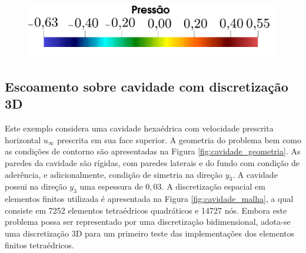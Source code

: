 \begin{figure}[!htbp]
	{\includegraphics[trim=0cm 0.2cm 0cm 0cm,clip=true,scale=0.3]{Imagens/Cap2/cilindro_legendaPress.pdf}}
	\label{fig:cilindro_camposPressao}
\end{figure}

\subsection{Escoamento sobre cavidade com discretização 3D} \label{capitulo:Cap2:VerApl:CavQuad}

Este exemplo considera uma cavidade hexaédrica com velocidade prescrita horizontal $u_{\infty}$ prescrita em sua face superior. A geometria do problema bem como as condições de contorno são apresentadas na Figura \ref{fig:cavidade_geometria}. As paredes da cavidade são rígidas, com paredes laterais e do fundo com condição de aderência, e adicionalmente, condição de simetria na direção $y_3$. A cavidade possui na direção $y_3$ uma espessura de $0,03$. A discretização espacial em elementos finitos utilizada é apresentada na Figura \ref{fig:cavidade_malha}, a qual consiste em 7252 elementos tetraédricos quadráticos e 14727 nós.  Embora este problema possa ser representado por uma discretização bidimensional, adota-se uma discretização 3D para um primeiro teste das implementações dos elementos finitos tetraédricos.

